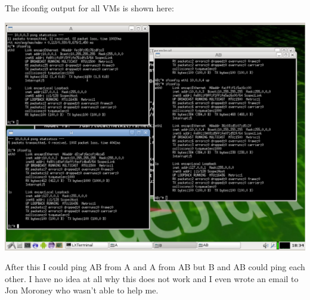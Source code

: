 \documentclass[12pt, a4paper]{article}
\begin{document}
The ifconfig output for all VMs is shown here:

\includegraphics[width=\linewidth]{screenshots/ifconfig}

After this I could ping AB from A and A from AB but B and AB could ping each other. I have no idea at all why this does not work and I even wrote an email to Jon Moroney who wasn't able to help me.
\end{document}
